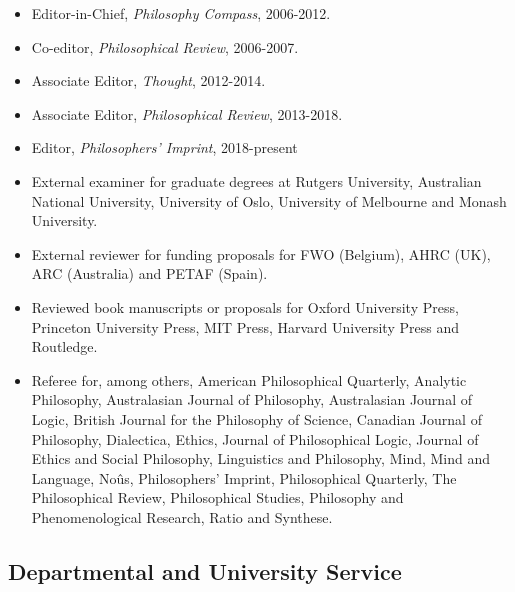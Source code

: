 \documentclass[
  10pt,
  letterpaper,
  DIV=11,
  numbers=noendperiod,
  twoside]{scrartcl}
\providecommand{\tightlist}{%
  \setlength{\itemsep}{0pt}\setlength{\parskip}{0pt}}\usepackage{longtable,booktabs,array}
\begin{document}
\begin{itemize}
\tightlist
\item
  Editor-in-Chief, \emph{Philosophy Compass}, 2006-2012.
\item
  Co-editor, \emph{Philosophical Review}, 2006-2007.
\item
  Associate Editor, \emph{Thought}, 2012-2014.
\item
  Associate Editor, \emph{Philosophical Review}, 2013-2018.
\item
  Editor, \emph{Philosophers' Imprint}, 2018-present
\item
  External examiner for graduate degrees at Rutgers University,
  Australian National University, University of Oslo, University of
  Melbourne and Monash University.
\item
  External reviewer for funding proposals for FWO (Belgium), AHRC (UK),
  ARC (Australia) and PETAF (Spain).
\item
  Reviewed book manuscripts or proposals for Oxford University Press,
  Princeton University Press, MIT Press, Harvard University Press and
  Routledge.
\item
  Referee for, among others, American Philosophical Quarterly, Analytic
  Philosophy, Australasian Journal of Philosophy, Australasian Journal
  of Logic, British Journal for the Philosophy of Science, Canadian
  Journal of Philosophy, Dialectica, Ethics, Journal of Philosophical
  Logic, Journal of Ethics and Social Philosophy, Linguistics and
  Philosophy, Mind, Mind and Language, Noûs, Philosophers' Imprint,
  Philosophical Quarterly, The Philosophical Review, Philosophical
  Studies, Philosophy and Phenomenological Research, Ratio and Synthese.
\end{itemize}

\subsection{Departmental and University
Service}\label{departmental-and-university-service}
\end{document}
